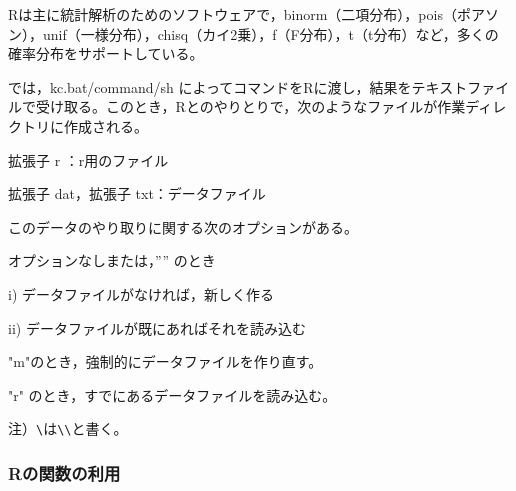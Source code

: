 \documentclass[papersize,a4paper,12pt,uplatex]{jsarticle}
\begin{document}
Rは主に統計解析のためのソフトウェアで，binorm（二項分布），pois（ポアソン），unif（一様分布），chisq（カイ2乗），f（F分布），t（t分布）など，多くの確率分布をサポートしている。

\ketcindy では，kc.bat/command/sh によってコマンドをRに渡し，結果をテキストファイルで受け取る。このとき，Rとのやりとりで，次のようなファイルが作業ディレクトリに作成される。

拡張子 r ：r用のファイル

拡張子 dat，拡張子 txt：データファイル

このデータのやり取りに関する次のオプションがある。

オプションなしまたは，”” のとき

i) データファイルがなければ，新しく作る

ii) データファイルが既にあればそれを読み込む

"m"のとき，強制的にデータファイルを作り直す。

"r" のとき，すでにあるデータファイルを読み込む。

注）\verb|\|は\verb|\\|と書く。

\vspace{\baselineskip}

\subsubsection{Rの関数の利用}
\end{document}
